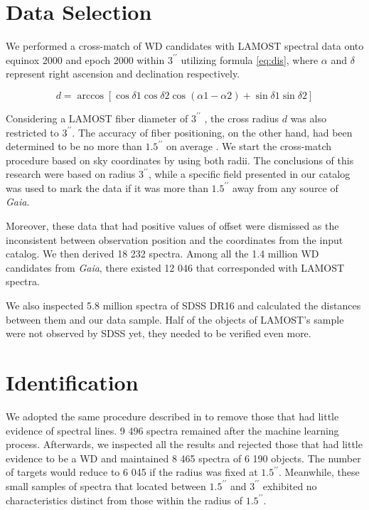 \documentclass{aastex631}
\begin{document}
\section{Data Selection} \label{sec:data}

We performed a cross-match of WD candidates with LAMOST spectral data onto equinox 2000 and epoch 2000 within $3^{\prime\prime}$ utilizing formula \ref{eq:dis}, where $\alpha$ and $\delta$ represent right ascension and declination respectively.

\begin{equation}	\label{eq:dis}
d = \arccos[\cos \delta 1 \cos \delta 2 \cos(\alpha 1-\alpha 2)+\sin \delta 1 \sin \delta 2]
\end{equation}

Considering a LAMOST fiber diameter of $3^{\prime\prime}$ \citep{2015RAA....15.1095L}, the cross radius $d$ was also restricted to $3^{\prime\prime}$.
The accuracy of fiber positioning, on the other hand, had been determined to be no more than $1.5^{\prime\prime}$ on average \citep{2014SPIE..9149....1}.
We start the cross-match procedure based on sky coordinates by using both radii.
The conclusions of this research were based on radius $3^{\prime\prime}$, while a specific field presented in our catalog was used to mark the data if it was more than $1.5^{\prime\prime}$ away from any source of {\it Gaia}.

Moreover, these data that had positive values of offset were dismissed as the inconsistent between observation position and the coordinates from the input catalog.
We then derived 18 232 spectra.
Among all the 1.4 million WD candidates from {\it Gaia}, there existed 12 046 that corresponded with LAMOST spectra.

We also inspected 5.8 million spectra of SDSS DR16 \citep{2020ApJS..249....3A} and calculated the distances between them and our data sample.
Half of the objects of LAMOST's sample were not observed by SDSS yet, they needed to be verified even more.


\section{Identification} \label{sec:identity}

We adopted the same procedure described in \cite{2018PASP..130h4203K} to remove those that had little evidence of spectral lines.
9 496 spectra remained after the machine learning process.
Afterwards, we inspected all the results and rejected those that had little evidence to be a WD and maintained 8 465 spectra of 6 190 objects.
The number of targets would reduce to 6 045 if the radius was fixed at $1.5^{\prime\prime}$.
Meanwhile, these small samples of spectra that located between $1.5^{\prime\prime}$ and $3^{\prime\prime}$ exhibited no characteristics distinct from those within the radius of $1.5^{\prime\prime}$.
\end{document}
